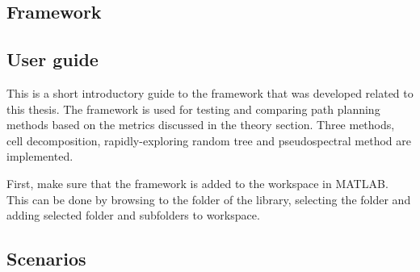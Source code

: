 \begin{appendices}
\chapter{Framework}
\section{User guide}
This is a short introductory guide to the framework that was developed related to this thesis. The framework is used for testing and comparing path planning methods based on the metrics discussed in the theory section. Three methods, cell decomposition, rapidly-exploring random tree and pseudospectral method are implemented.

First, make sure that the framework is added to the workspace in MATLAB. This can be done by browsing to the folder of the library, selecting the folder and adding selected folder and subfolders to workspace. 

  
\section{Scenarios}

\newcommand{\sourcepath}{../matlab/lib}








%

%

%

%


\end{appendices}


